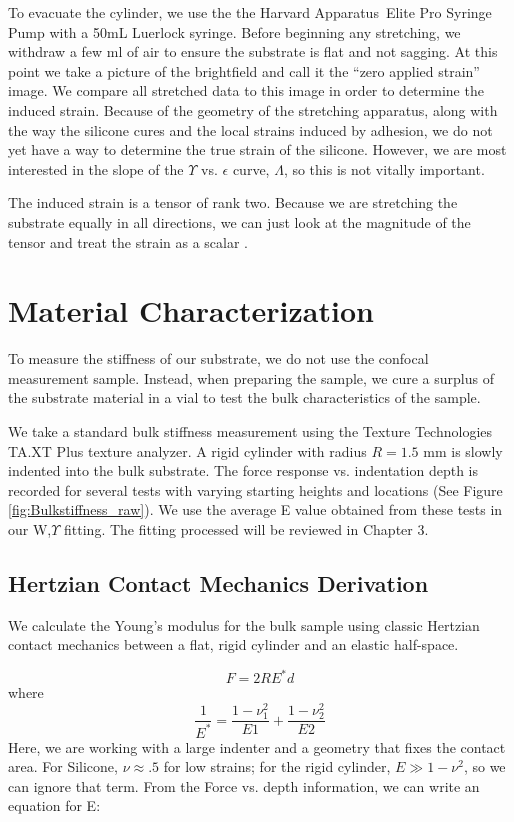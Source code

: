 To evacuate the cylinder, we use the the Harvard Apparatus\texttrademark \ Elite Pro Syringe Pump with a 50mL Luerlock syringe. Before beginning any stretching, we withdraw a few ml of air to ensure the substrate is flat and not sagging. At this point we take a picture of the brightfield and call it the ``zero applied strain'' image. We compare all stretched data to this image in order to determine the induced strain. Because of the geometry of the stretching apparatus, along with the way the silicone cures and the local strains induced by adhesion, we do not yet have a way to determine the true strain of the silicone. However, we are most interested in the slope of the $\Upsilon$ vs. $\epsilon$ curve, $\Lambda$, so this is not vitally important.

The induced strain is a tensor of rank two. Because we are stretching the substrate equally in all directions, we can just look at the magnitude of the tensor and treat the strain as a scalar \cite{xu2017direct,xu2018surface}.     


\section{Material Characterization}
To measure the stiffness of our substrate, we do not use the confocal measurement sample. Instead, when preparing the sample, we cure a surplus of the substrate material in a vial to test the bulk characteristics of the sample. 

We take a standard bulk stiffness measurement using the Texture Technologies TA.XT Plus texture analyzer. A rigid cylinder with radius $R = 1.5$ mm is slowly indented into the bulk substrate. The force response vs. indentation depth is recorded for several tests with varying starting heights and locations (See Figure \ref{fig:Bulkstiffness_raw}). We use the average E value obtained from these tests in our W,$ \Upsilon $ fitting. The fitting processed will be reviewed in Chapter 3. 


\subsection{Hertzian Contact Mechanics Derivation}
We calculate the Young's modulus for the bulk sample using classic Hertzian contact mechanics between a flat, rigid cylinder and an elastic half-space.

\begin{equation}
F=2RE^*d
\end{equation}
where 
\begin{equation*}
\frac{1}{E^*} = \frac{1-\nu_1^2}{E1} + \frac{1-\nu_2^2}{E2}
\end{equation*}
Here, we are working with a large indenter and a geometry that fixes the contact area. For Silicone, $ \nu \approx .5$ for low strains; for the rigid cylinder, $ E \gg 1-\nu^2 $, so we can ignore that term. From the Force vs. depth information, we can write an equation for E:

